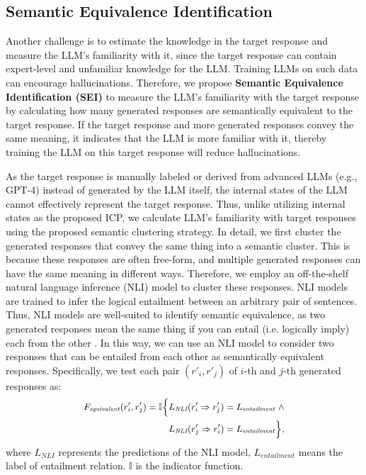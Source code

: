 \subsection{Semantic Equivalence Identification}
\label{section:SEI}
Another challenge is to estimate the knowledge in the target response and measure the LLM's familiarity with it, since the target response can contain expert-level and unfamiliar knowledge for the LLM.
Training LLMs on such data can encourage hallucinations.
Therefore, we propose \textbf{Semantic Equivalence Identification (SEI)} to measure the LLM’s familiarity with the target response by calculating how many generated responses are semantically equivalent to the target response.
If the target response and more generated responses convey the same meaning, it indicates that the LLM is more familiar with it, thereby training the LLM on this target response will reduce hallucinations.


As the target response is manually labeled or derived from advanced LLMs (e.g., GPT-4) instead of generated by the LLM itself, the internal states of the LLM cannot effectively represent the target response.
Thus, unlike utilizing internal states as the proposed ICP, we calculate LLM's familiarity with target responses using the proposed semantic clustering strategy.
In detail, we first cluster the generated responses that convey the same thing into a semantic cluster.
This is because these responses are often free-form, and multiple generated responses can have the same meaning in different ways.
Therefore, we employ an off-the-shelf natural language inference (NLI) model to cluster these responses.
NLI models are trained to infer the logical entailment between an arbitrary pair of sentences.
Thus, NLI models are well-suited to identify semantic equivalence, as two generated responses mean the same thing if you can entail (i.e. logically imply) each from the other \citep{kuhn2023semantic, jung-etal-2024-impossible}.
In this way, we can use an NLI model to consider two responses that can be entailed from each other as semantically equivalent responses.
Specifically, we test each pair $(r'_i, r'_j)$ of $i$-th and $j$-th generated responses as:
\begin{align}
\small
\begin{split}
    F_{\textit{equivalent}}(r'_i, r'_j) = \mathbb I \Bigl\{ & L_{\textit{NLI}}(r'_i \Rightarrow r'_j) = L_{\textit{entailment}} \,\, \land \\
    & L_{\textit{NLI}}(r'_j \Rightarrow r'_i) =L_{\textit{entailment}} \Bigr\},
\end{split}
\end{align}
where $L_{NLI}$ represents the predictions of the NLI model, $L_{entailment}$ means the label of entailment relation.
$\mathbb I$ is the indicator function.

